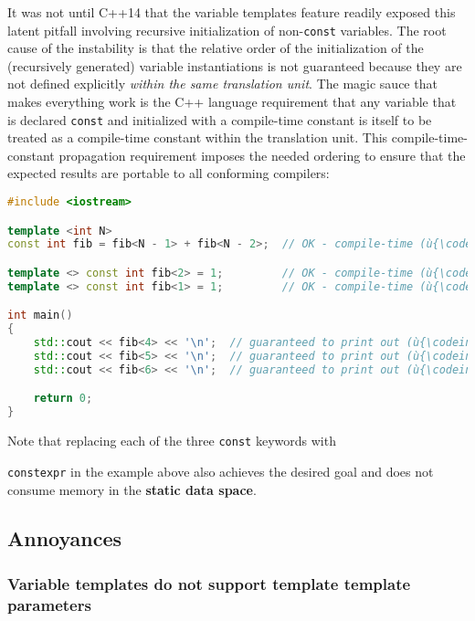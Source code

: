 {\noindent It was not until C++14 that the variable templates feature
readily exposed this latent pitfall involving recursive initialization
of non-\texttt{const} variables. The root cause of the instability is
that the relative order of the initialization of the (recursively
generated) variable instantiations is not guaranteed because they are
not defined explicitly \emph{within the same translation unit}. The
magic sauce that makes everything work is the C++ language requirement
that any variable that is declared \texttt{const} and initialized with a
compile-time constant is itself to be treated as a compile-time constant
within the translation unit. This compile-time-constant propagation
requirement imposes the needed ordering to ensure that the expected
results are portable to all conforming compilers:

\begin{lstlisting}[language=C++]
#include <iostream>

template <int N>
const int fib = fib<N - 1> + fib<N - 2>;  // OK - compile-time (ù{\codeincomments{const}}ù).

template <> const int fib<2> = 1;         // OK - compile-time (ù{\codeincomments{const}}ù).
template <> const int fib<1> = 1;         // OK - compile-time (ù{\codeincomments{const}}ù).

int main()
{
    std::cout << fib<4> << '\n';  // guaranteed to print out (ù{\codeincomments{3}}ù)
    std::cout << fib<5> << '\n';  // guaranteed to print out (ù{\codeincomments{5}}ù)
    std::cout << fib<6> << '\n';  // guaranteed to print out (ù{\codeincomments{8}}ù)

    return 0;
}
\end{lstlisting}
    
\noindent Note that replacing each of the three \texttt{const} keywords with
{\texttt{constexpr} in the example above also achieves the
desired goal and does not consume memory in the \textbf{static data
space}.

\subsection[Annoyances]{Annoyances}\label{annoyances}

\subsubsection[Variable templates do not support template template parameters]{Variable templates do not support template template parameters}\label{variable-templates-do-not-support-template-template-parameters}

}}
